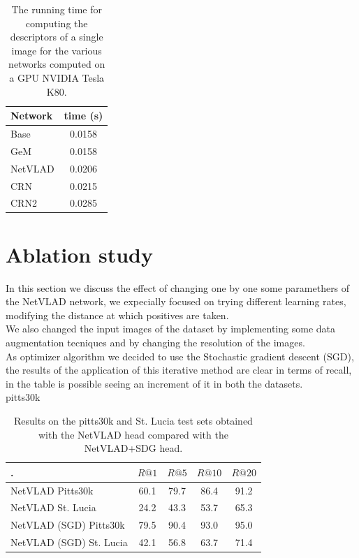 \documentclass[10pt,twocolumn,letterpaper]{article}
\begin{document}
\begin{table}
   \centering
   \begin{tabular}{|l|c|}
      \hline
      Network     &  time (s)\\\hline
      Base       &  0.0158\\
      GeM        &  0.0158\\
      NetVLAD     &  0.0206\\
      CRN         &  0.0215\\
      CRN2        &  0.0285\\\hline
   \end{tabular}
   \caption{The running time for computing the descriptors of a single image for the various networks computed on a GPU NVIDIA Tesla K80.}
   \label{tab:time}
\end{table}

	
\section{Ablation study}
In this section we discuss the effect of changing one by one some paramethers of the NetVLAD network, we expecially focused on trying different learning rates, modifying the distance at which positives are taken.\\ We also changed the input images of the dataset by implementing some data augmentation tecniques and by changing the resolution of the images.\\
As optimizer algorithm we decided to use the Stochastic gradient descent (SGD), the results of the application of this iterative method are clear in terms of recall, in the table is possible seeing an increment of it in both the datasets.\\
pitts30k
\begin{table}[!h]
	\centering
	\begin{tabular}{|l|c|c|c|c|}
		\hline
		.&        $R@1$   &        $R@5$   &        $R@10$  &        $R@20$   \\ \hline
		NetVLAD  Pitts30k     &         60.1   &         79.7   &          86.4   &          91.2   \\
		NetVLAD St. Lucia        &         24.2   &         43.3   &          53.7   &          65.3   \\ \hline
		NetVLAD (SGD) Pitts30k  &         79.5   &         90.4   &          93.0   &          95.0   \\ 
		NetVLAD (SGD) St. Lucia      &         42.1   & 56.8  &  63.7  &  71.4  \\
		 \hline
	\end{tabular}
	\caption{Results on the pitts30k and St. Lucia test sets obtained with the NetVLAD head compared with the NetVLAD+SDG head.}
	\label{tab:base_results}
\end{table}
\end{document}
